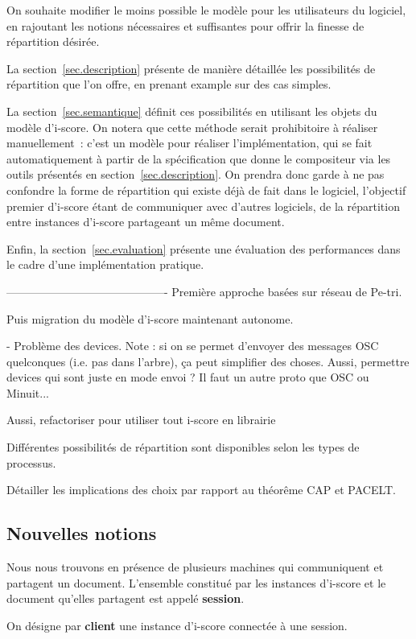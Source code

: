 \documentclass{article}
\newcommand\vocab[1]{\textbf{#1}}
\begin{document}
On souhaite modifier le moins possible le modèle pour les utilisateurs du logiciel, 
en rajoutant les notions nécessaires et suffisantes pour offrir la finesse de répartition désirée.

La section~\ref{sec.description} présente de manière détaillée les possibilités 
de répartition que l'on offre, en prenant example sur des cas simples.

La section~\ref{sec.semantique} définit ces possibilités en utilisant les objets du modèle d'i-score. 
On notera que cette méthode serait prohibitoire à réaliser manuellement~: c'est un modèle pour réaliser l'implémentation, qui se fait automatiquement à partir de la spécification que donne le compositeur via les outils présentés en section~\ref{sec.description}. 
On prendra donc garde à ne pas confondre la forme de répartition qui existe déjà de fait dans le logiciel, l'objectif premier d'i-score étant de communiquer avec d'autres logiciels, de la répartition entre instances d'i-score partageant un même document.

Enfin, la section~\ref{sec.evaluation} présente une évaluation des performances dans le cadre 
d'une implémentation pratique.

-------------------------------------------
Première approche basées sur réseau de Pe-tri.

Puis migration du modèle d'i-score maintenant autonome.


- Problème des devices. Note : si on se permet d'envoyer des messages OSC quelconques (i.e. pas dans l'arbre), ça peut simplifier des choses. Aussi, permettre devices qui sont juste en mode envoi ? Il faut un autre proto que OSC ou Minuit...

Aussi, refactoriser pour utiliser tout i-score en librairie

Différentes possibilités de répartition sont disponibles selon les types de processus.

Détailler les implications des choix par rapport au théorême CAP et PACELT.

\subsection{Nouvelles notions}
Nous nous trouvons en présence de plusieurs machines qui communiquent et partagent un document.
L'ensemble constitué par les instances d'i-score et le document qu'elles partagent est appelé \vocab{session}.

On désigne par \vocab{client} une instance d'i-score connectée à une session.
\end{document}
